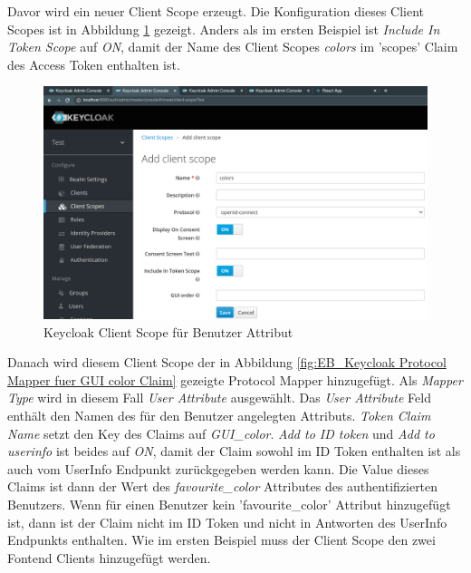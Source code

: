 Davor wird ein neuer Client Scope erzeugt. Die Konfiguration dieses Client Scopes ist in Abbildung \ref{fig:EB_Keycloak Client Scope für User Attribut} gezeigt. Anders als im ersten Beispiel ist \textit{Include In Token Scope} auf \textit{ON}, damit der Name des Client Scopes \textit{colors} im 'scopes' Claim des Access Token enthalten ist.

\begin{figure}[!ht]
	\centering
	\includegraphics[width=1\textwidth]{Images/Ebert/KeycloakNewUserAttributeClientScope.PNG}
	\caption{Keycloak Client Scope für Benutzer Attribut}
	\label{fig:EB_Keycloak Client Scope für User Attribut}
\end{figure}

Danach wird diesem Client Scope der in Abbildung \ref{fig:EB_Keycloak Protocol Mapper fuer GUI color Claim} gezeigte Protocol Mapper hinzugefügt. Als \textit{Mapper Type} wird in diesem Fall \textit{User Attribute} ausgewählt. Das \textit{User Attribute} Feld enthält den Namen des für den Benutzer angelegten Attributs. \textit{Token Claim Name} setzt den Key des Claims auf \textit{GUI\_color}. \textit{Add to ID token} und \textit{Add to userinfo} ist beides auf \textit{ON}, damit der Claim sowohl im ID Token enthalten ist als auch vom UserInfo Endpunkt zurückgegeben werden kann. Die Value dieses Claims ist dann der Wert des \textit{favourite\_color} Attributes des authentifizierten Benutzers. Wenn für einen Benutzer kein 'favourite\_color' Attribut hinzugefügt ist, dann ist der Claim nicht im ID Token und nicht in Antworten des UserInfo Endpunkts enthalten. Wie im ersten Beispiel muss der Client Scope den zwei Fontend Clients hinzugefügt werden.

